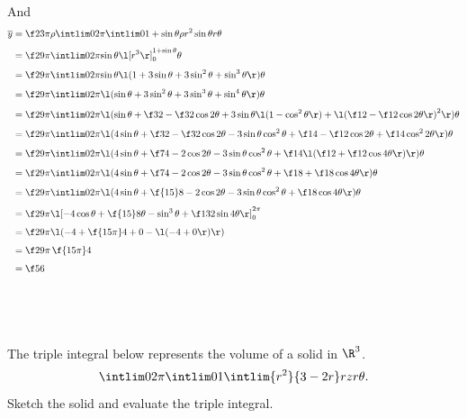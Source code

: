 \documentclass[a4paper]{article}
\begin{document}
And \begin{align*}
\overline y &= \f2{3\pi\rho} \intlim 0{2\pi} {\intlim 0 {1 + \sin \theta} {\rho r^2 \sin \theta} r} \theta \\[1ex]
&= \f2{9\pi} \intlim 0{2\pi} {\sin \theta {\l[r^3\r]}_0^{1 + \sin\theta}} \theta \\[1ex]
&= \f2{9\pi} \intlim 0{2\pi} {\sin \theta \l( 1 + 3\sin\theta + 3\sin^2 \theta + \sin^3 \theta \r)} \theta \\[1ex]
&= \f2{9\pi} \intlim 0{2\pi} {\l( \sin\theta + 3\sin^2 \theta + 3\sin^3 \theta + \sin^4 \theta \r)} \theta \\[1ex]
&= \f2{9\pi} \intlim 0{2\pi} {\l( \sin\theta + \f32 - \f32 \cos 2\theta + 3 \sin \theta \l(1 - \cos^2 \theta\r) + {\l( \f12 - \f12 \cos 2\theta \r)}^2 \r)} \theta \\[1ex]
&= \f2{9\pi} \intlim 0{2\pi} {\l( 4 \sin\theta + \f32 - \f32 \cos 2\theta - 3 \sin\theta \cos^2 \theta + \f14 - \f12 \cos 2\theta + \f14 \cos^2 2\theta \r)} \theta \\[1ex]
&= \f2{9\pi} \intlim 0{2\pi} {\l( 4 \sin\theta + \f74 - 2 \cos 2\theta - 3 \sin\theta \cos^2 \theta + \f14 \l( \f12 + \f12 \cos 4\theta \r) \r)} \theta \\[1ex]
&= \f2{9\pi} \intlim 0{2\pi} {\l( 4 \sin\theta + \f74 - 2 \cos 2\theta - 3 \sin\theta \cos^2 \theta + \f18 + \f18 \cos 4\theta \r)} \theta \\[1ex]
&= \f2{9\pi} \intlim 0{2\pi} {\l( 4 \sin\theta + \f{15}8 - 2 \cos 2\theta - 3 \sin\theta \cos^2 \theta + \f18 \cos 4\theta \r)} \theta \\[1ex]
&= \f2{9\pi} {\l[ -4\cos\theta + \f{15}8 \theta - \sin^3 \theta + \f1{32}\sin 4\theta \r]}_0^{2\pi} \\[1ex]
&= \f2{9\pi} \l( -4 + \f{15\pi}4 + 0 - \l( -4 + 0 \r) \r) \\[1ex]
&= \f2{9\pi} \, \f{15\pi}4 \\[1ex]
&= \f56
\end{align*}


\subsection{~} %

\begin{questionbody}
The triple integral below represents the volume of a solid in $\R^3$. \[
\intlim 0{2\pi} {\intlim 0 1 {\intlim {r^2} {3-2r} r z} r} \theta .
\] Sketch the solid and evaluate the triple integral.
\end{questionbody}
\end{document}
